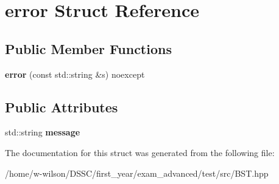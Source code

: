 \hypertarget{structerror}{}\section{error Struct Reference}
\label{structerror}
\subsection*{Public Member Functions}
\begin{DoxyCompactItemize}
\item 
\mbox{\label{structerror_a38f200668180ab796773718fda039346}} 
{\bfseries error} (const std\+::string \&s) noexcept
\end{DoxyCompactItemize}
\subsection*{Public Attributes}
\begin{DoxyCompactItemize}
\item 
\mbox{\label{structerror_acfe267b2efc0e70c21167247824c684c}} 
std\+::string {\bfseries message}
\end{DoxyCompactItemize}


The documentation for this struct was generated from the following file\+:\begin{DoxyCompactItemize}
\item 
/home/w-\/wilson/\+D\+S\+S\+C/first\+\_\+year/exam\+\_\+advanced/test/src/B\+S\+T.\+hpp\end{DoxyCompactItemize}
